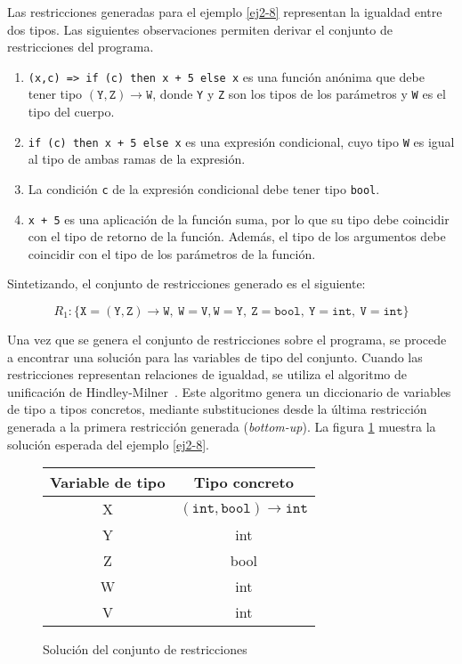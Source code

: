 Las restricciones generadas para el ejemplo \ref{ej2-8} representan la igualdad entre dos tipos. Las siguientes observaciones permiten derivar el conjunto de restricciones del programa.

\begin{enumerate}
  \item \texttt{(x,c) =>\ if (c) then x + 5 else x} es una función anónima que debe tener tipo $\mathtt{(Y,Z) \rightarrow W}$, donde \texttt{Y} y \texttt{Z} son los tipos de los parámetros y \texttt{W} es el tipo del cuerpo.
  \item \texttt{if (c) then x + 5 else x} es una expresión condicional, cuyo tipo \texttt{W} es igual al tipo de ambas ramas de la expresión.
  \item La condición \texttt{c} de la expresión condicional debe tener tipo \texttt{bool}.
  \item \texttt{x + 5} es una aplicación de la función suma, por lo que su tipo debe coincidir con el tipo de retorno de la función. Además, el tipo de los argumentos debe coincidir con el tipo de los parámetros de la función.
\end{enumerate}

Sintetizando, el conjunto de restricciones generado es el siguiente:

\[
R_1: \{ \mathtt{X = (Y,Z) \rightarrow W,\ W = V, W = Y,\ Z = bool,\ Y = int,\ V = int} \}
\]

Una vez que se genera el conjunto de restricciones sobre el programa, se procede a encontrar una solución para las variables de tipo del conjunto. Cuando las restricciones representan relaciones de igualdad, se utiliza el algoritmo de unificación de Hindley-Milner~\cite{damasmilner}. Este algoritmo genera un diccionario de variables de tipo a tipos concretos, mediante substituciones desde la última restricción generada a la primera restricción generada (\emph{bottom-up}). La figura \ref{tabla2} muestra la solución esperada del ejemplo \ref{ej2-8}.

\begin{figure}[ht]
  \centering
  \ttfamily
  \begin{tabular}{c c}
    Variable de tipo & Tipo concreto \\
    \hline
    X & $\mathtt{(int, bool) \rightarrow int}$  \\
    Y & int \\
    Z & bool \\
    W & int \\
    V & int \\
  \end{tabular}
  \caption{Solución del conjunto de restricciones}
  \label{tabla2}
\end{figure}


